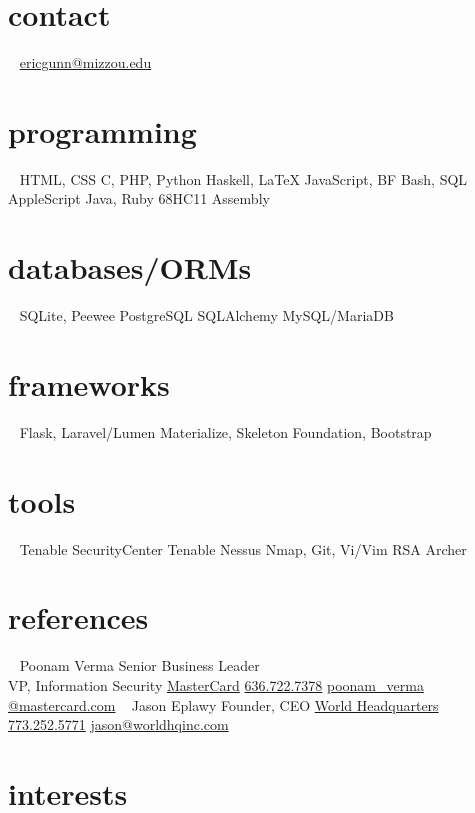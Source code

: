 \documentclass[print]{gunn-resume}
\begin{document}
\begin{aside}
  \section{contact}
  ~
    \href{mailto:ericgunn@mizzou.edu}{ericgunn@mizzou.edu}
  \section{programming}
  ~
    HTML, CSS
    C, PHP, Python
    Haskell, \LaTeX
    JavaScript, BF
    Bash, SQL
    AppleScript
    Java, Ruby
    68HC11 Assembly
 \section{databases/ORMs}
 ~
 SQLite, Peewee
 PostgreSQL
 SQLAlchemy
 MySQL/MariaDB
 \section{frameworks}
 ~
 Flask, Laravel/Lumen
 Materialize, Skeleton
 Foundation, Bootstrap
 \section{tools}
 ~
 Tenable SecurityCenter
 Tenable Nessus
 Nmap, Git, Vi/Vim
 RSA Archer
 \section{references}
 ~
 Poonam Verma
 Senior Business Leader\\VP, Information Security
 \href{http://mastercard.com}{MasterCard}
 \href{16367227378}{636.722.7378}
\href{mailto:poonam_verma@mastercard.com}{poonam\_verma\\@mastercard.com}
 ~
 Jason Eplawy
 Founder, CEO
 \href{http://worldhqinc.com}{World Headquarters}
 \href{17732525771}{773.252.5771}
\href{mailto:jason@worldhqinc.com}{jason@worldhqinc.com}
 ~
\end{aside}

\section{interests}
\end{document}
